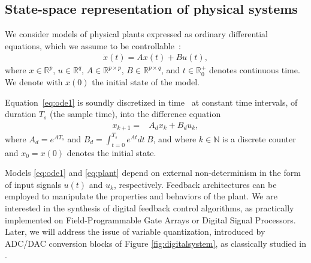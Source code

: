\documentclass[twocolumn]{autart}    %
\newcommand{\mat}[1]{{#1}}
\renewcommand{\vec}[1]{{#1}}
\begin{document}

\subsection{State-space representation of physical systems}
\label{sec:model}

We consider models of physical plants expressed as ordinary differential
equations, which we assume to be controllable~\cite{Astrom08}: 
%
\begin{align}
\label{eq:ode1}
\dot{x}(t) = \mat{A}\vec{x}(t)+ \mat{B} \vec{u}(t), 
\end{align}
%
where 
$\vec{x} \in \mathbb{R}^p$,  
$\vec{u} \in \mathbb{R}^q$, 
$\mat{A} \in \mathbb{R}^{p \times p}$, 
$\mat{B} \in \mathbb{R}^{p \times q}$,
and $t \in \mathbb R_0^+$ denotes continuous time. 
We denote with $x(0)$ the initial state of the model.

Equation~\eqref{eq:ode1} is soundly discretized in time~\cite{middleton1990digital,van1978computing} at constant time intervals,
of duration $T_s$ (the sample time), 
into the difference equation
%
\begin{align}
\label{eq:plant}
\vec{x}_{k+1} =& \mat{A}_d \vec{x}_k+ \mat{B}_d \vec{u}_k, 
\end{align} 
where 
$\mat{A}_d=e^{\mat{A}T_s}$ and 
$\mat{B}_d = \int_{t = 0}^{T_s} e^{\mat{A} t} dt\ \mat{B}$, 
and where $k \in \mathbb N$ is a discrete counter and $\vec{x}_{0}=\vec{x}(0)$ denotes the initial state.  

Models \eqref{eq:ode1} and \eqref{eq:plant} depend on external non-determinism in the form of input signals $u (t)$ and  $u_k$, respectively. 
Feedback architectures can be employed to manipulate the properties and behaviors of the plant.   
We are interested in the synthesis of digital feedback control algorithms, 
as practically implemented on Field-Programmable Gate Arrays or Digital Signal Processors. 
Later, we will address the issue of variable quantization, 
introduced by ADC/DAC conversion blocks of Figure \ref{fig:digitalsystem}, 
as classically studied in \cite{astrom1997computer}. 
\end{document}
